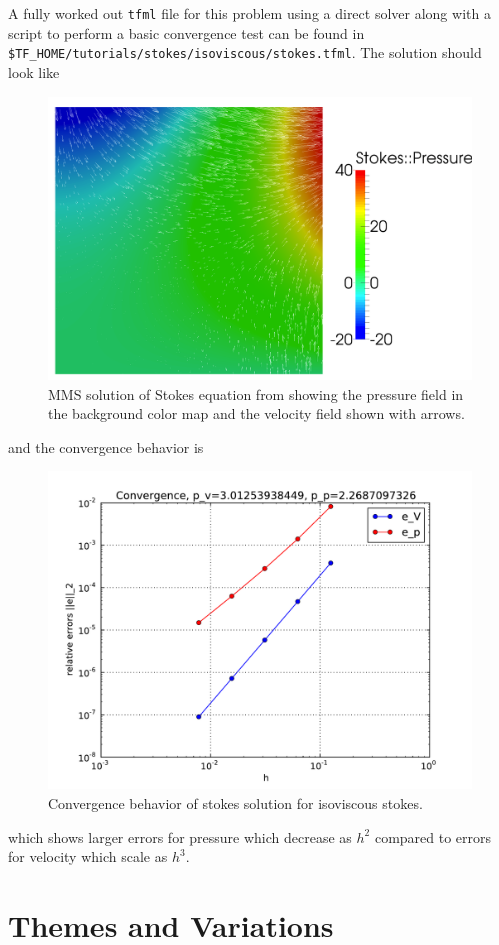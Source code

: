 A fully worked out \texttt{tfml} file for this problem using a direct
solver along with a script to perform a basic convergence test can be
found in \texttt{\$TF\_HOME/tutorials/stokes/isoviscous/stokes.tfml}.
The solution should look like
\begin{figure}[htbp!]
  \centering
  \includegraphics[width=.7\textwidth]{figures/stokes_flow.png}
  \caption{MMS solution of Stokes equation from
    \cite{elman_finite_2005} showing the pressure field in the background color map and the velocity field shown with arrows.}
  \label{fig:stokesMMS}
\end{figure}
and the convergence behavior is
\begin{figure}[htbp!]
  \centering
  \includegraphics[width=.7\textwidth]{figures/Stokes_convergence.pdf}
  \caption{Convergence behavior of stokes solution for isoviscous stokes.}
  \label{fig:stokes_convergence}
\end{figure}
which shows larger errors for pressure which decrease as $h^{2}$
compared to errors for velocity which scale as $h^{3}$.





\section{Themes and Variations}
\label{sec:themes-variations}

